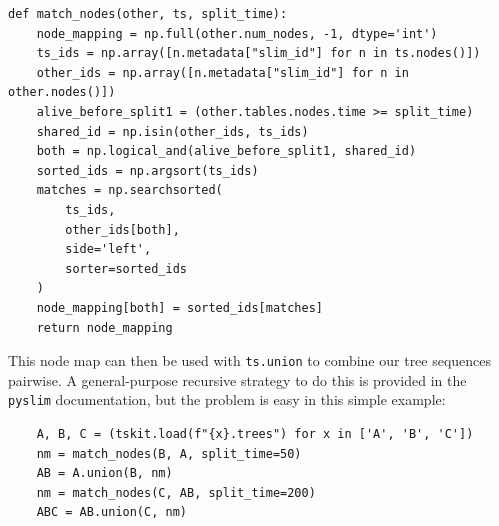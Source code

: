 \documentclass[12pt]{article}
\newcommand{\pyslim}[0]{\texttt{pyslim}\xspace}
\begin{document}
\begin{verbatim}
def match_nodes(other, ts, split_time):
    node_mapping = np.full(other.num_nodes, -1, dtype='int')
    ts_ids = np.array([n.metadata["slim_id"] for n in ts.nodes()])
    other_ids = np.array([n.metadata["slim_id"] for n in other.nodes()])
    alive_before_split1 = (other.tables.nodes.time >= split_time)
    shared_id = np.isin(other_ids, ts_ids)
    both = np.logical_and(alive_before_split1, shared_id)
    sorted_ids = np.argsort(ts_ids)
    matches = np.searchsorted(
        ts_ids,
        other_ids[both],
        side='left',
        sorter=sorted_ids
    )
    node_mapping[both] = sorted_ids[matches]
    return node_mapping
\end{verbatim}
This node map can then be used with \verb|ts.union| to combine our tree sequences pairwise.
A general-purpose recursive strategy to do this is provided in the \pyslim documentation,
but the problem is easy in this simple example:
\begin{verbatim}
    A, B, C = (tskit.load(f"{x}.trees") for x in ['A', 'B', 'C'])
    nm = match_nodes(B, A, split_time=50)
    AB = A.union(B, nm)
    nm = match_nodes(C, AB, split_time=200)
    ABC = AB.union(C, nm)
\end{verbatim}
% 
% 
\end{document}
